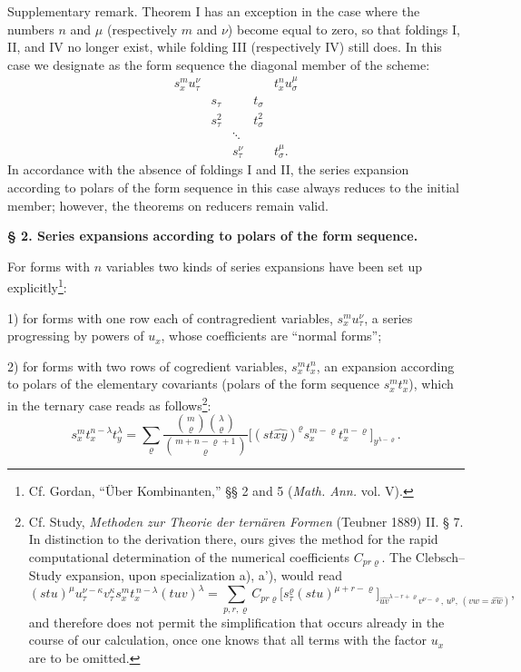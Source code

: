 \documentclass[11pt]{article}
\begin{document}
Supplementary remark. Theorem I has an exception in the case where the numbers $n$ and $\mu$ (respectively $m$ and $\nu$) become equal to zero, so that foldings I, II, and IV no longer exist, while folding III (respectively IV) still does. In this case we designate as the form sequence the diagonal member of the scheme:
\[
\begin{array}{ccccc}
s_x^m u_\tau^\nu &&&& t_x^n u_\sigma^\mu\\
& s_\tau && t_\sigma &\\
& s_\tau^2 && t_\sigma^2 &\\
&&\ddots&&\\
&&s_\tau^\nu && t_\sigma^\mu .
\end{array}
\]
In accordance with the absence of foldings I and II, the series expansion according to polars of the form sequence in this case always reduces to the initial member; however, the theorems on reducers remain valid.

\begin{center}
\textbf{§ 2. \quad Series expansions according to polars of the form sequence.}
\end{center}

For forms with $n$ variables two kinds of series expansions have been set up explicitly\footnote{Cf. Gordan, ``Über Kombinanten,'' §§ 2 and 5 (\emph{Math. Ann.} vol. V).}:

1) for forms with one row each of contragredient variables, $s_x^m u_\tau^\nu$, a series progressing by powers of $u_x$, whose coefficients are ``normal forms'';

2) for forms with two rows of cogredient variables, $s_x^m t_x^n$, an expansion according to polars of the elementary covariants (polars of the form sequence $s_x^m t_x^n$), which in the ternary case reads as follows\footnote{Cf. Study, \emph{Methoden zur Theorie der ternären Formen} (Teubner 1889) II. § 7. In distinction to the derivation there, ours gives the method for the rapid computational determination of the numerical coefficients $C_{pr\varrho}$. The Clebsch--Study expansion, upon specialization a), a'), would read
\[
(stu)^\mu u_\tau^{\nu-\kappa}v_\tau^\kappa s_x^m t_x^{\,n-\lambda}(tuv)^\lambda
=\sum_{p,r,\varrho} C_{pr\varrho}
\bigl[s_\tau^\varrho(stu)^{\mu+r-\varrho}\bigr]_{\widehat{uv}^{\lambda-r+\varrho}v^{\nu-\varrho},\,u^p,\,(vw=\widehat{xw})},
\]
and therefore does not permit the simplification that occurs already in the course of our calculation, once one knows that all terms with the factor $u_x$ are to be omitted.}:
\[
\tag{I}
s_x^m t_x^{n-\lambda}t_y^\lambda
=\sum_{\varrho}
\frac{\binom{m}{\varrho}\binom{\lambda}{\varrho}}
{\binom{m+n-\varrho+1}{\varrho}}
\bigl[(st\widehat{xy})^\varrho s_x^{m-\varrho}t_x^{n-\varrho}\bigr]_{y^{\lambda-\varrho}}.
\]
\end{document}
